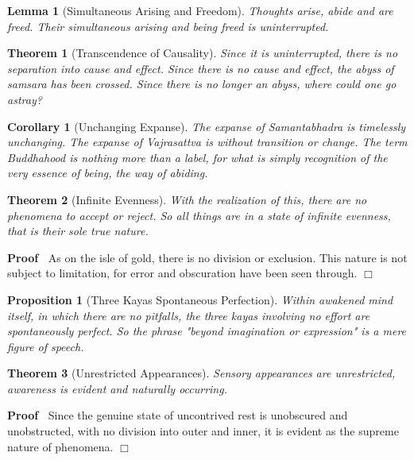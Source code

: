 \documentclass{article}
\newenvironment{proof}{\noindent\textbf{Proof\ }}{\hspace*{\fill}$\Box$\medskip}
\newtheorem{corollary}{Corollary}
\newtheorem{lemma}{Lemma}
\newtheorem{proposition}{Proposition}
{\theorembodyfont{\rmfamily}\newtheorem{remark}{Remark}}
\newtheorem{theorem}{Theorem}
\begin{document}
\begin{lemma}
  [Simultaneous Arising and Freedom] Thoughts arise, abide and are freed.
  Their simultaneous arising and being freed is uninterrupted.
\end{lemma}

\begin{theorem}
  [Transcendence of Causality] Since it is uninterrupted, there is no
  separation into cause and effect. Since there is no cause and effect, the
  abyss of samsara has been crossed. Since there is no longer an abyss, where
  could one go astray?
\end{theorem}

\begin{corollary}
  [Unchanging Expanse] The expanse of Samantabhadra is timelessly unchanging.
  The expanse of Vajrasattva is without transition or change. The term
  Buddhahood is nothing more than a label, for what is simply recognition of
  the very essence of being, the way of abiding.
\end{corollary}

\begin{theorem}
  [Infinite Evenness] With the realization of this, there are no phenomena to
  accept or reject. So all things are in a state of infinite evenness, that is
  their sole true nature.
\end{theorem}

\begin{proof}
  As on the isle of gold, there is no division or exclusion. This nature is
  not subject to limitation, for error and obscuration have been seen through.
\end{proof}

\begin{proposition}
  [Three Kayas Spontaneous Perfection] Within awakened mind itself, in which
  there are no pitfalls, the three kayas involving no effort are spontaneously
  perfect. So the phrase "beyond imagination or expression" is a mere figure
  of speech.
\end{proposition}

\begin{theorem}
  [Unrestricted Appearances] Sensory appearances are unrestricted, awareness
  is evident and naturally occurring.
\end{theorem}

\begin{proof}
  Since the genuine state of uncontrived rest is unobscured and unobstructed,
  with no division into outer and inner, it is evident as the supreme nature
  of phenomena.
\end{proof}
\end{document}
